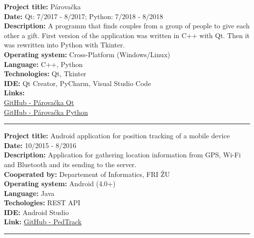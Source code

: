 \documentclass[slovak]{article}
\begin{document}
\noindent
\textbf{Project title:} Párovačka\\
\textbf{Date:} Qt: 7/2017 - 8/2017; Python: 7/2018 - 8/2018\\
\textbf{Description:} A programm that finds couples from a group of people to give each other a gift. First version of the application was written in C++ with Qt. Then it was rewritten into Python with Tkinter.\\
\textbf{Operating system:} Cross-Platform (Windows/Linux)\\
\textbf{Language:} C++, Python\\
\textbf{Technologies:} Qt, Tkinter\\
\textbf{IDE:} Qt Creator, PyCharm, Visual Studio Code\\
\textbf{Links:}\\
\href{https://github.com/kyberdrb/Parovacka\_Qt}{GitHub - Párovačka Qt}\\
\href{https://github.com/kyberdrb/Parovacka\_Python}{GitHub - Párovačka Python}

\begin{center}\rule{3in}{0.4pt}\end{center}

\noindent
\textbf{Project title:} Android application for position tracking of a mobile device\\
\textbf{Date:} 10/2015 - 8/2016\\
\textbf{Description:} Application for gathering location information from GPS, Wi-Fi and Bluetooth and its sending to the server.\\
\textbf{Cooperated by:} Departement of Informatics, FRI ŽU\\
\textbf{Operating system:} Android (4.0+)\\
\textbf{Language:} Java\\
\textbf{Techologies:} REST API\\
\textbf{IDE:} Android Studio\\
\textbf{Link:} \href{https://github.com/kyberdrb/PedTrack}{GitHub - PedTrack}

\begin{center}\rule{3in}{0.4pt}\end{center}
\end{document}
